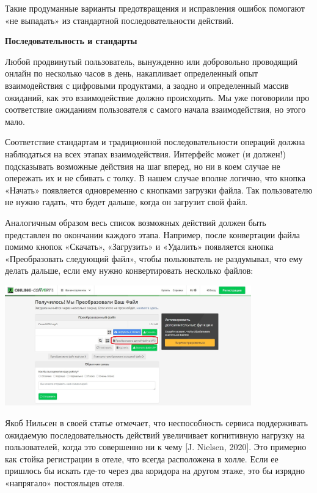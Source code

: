 Такие продуманные варианты предотвращения и исправления ошибок помогают «не выпадать» из стандартной последовательности действий.

\textbf{Последовательность и стандарты}

Любой продвинутый пользователь, вынужденно или добровольно проводящий онлайн по несколько часов в день, накапливает определенный опыт взаимодействия с цифровыми продуктами, а заодно и определенный массив ожиданий, как это взаимодействие должно происходить. Мы уже поговорили про соответствие ожиданиям пользователя с самого начала взаимодействия, но этого мало.

Соответствие стандартам и традиционной последовательности операций должна наблюдаться на всех этапах взаимодействия. Интерфейс может (и должен!) подсказывать возможные действия на шаг вперед, но ни в коем случае не опережать их и не сбивать с толку. В нашем случае вполне логично, что кнопка «Начать» появляется одновременно с кнопками загрузки файла. Так пользователю не нужно гадать, что будет дальше, когда он загрузит свой файл.

Аналогичным образом весь список возможных действий должен быть представлен по окончании каждого этапа. Например, после конвертации файла помимо кнопок «Скачать», «Загрузить» и «Удалить» появляется кнопка «Преобразовать следующий файл», чтобы пользователь не раздумывал, что ему делать дальше, если ему нужно конвертировать несколько файлов:


\begin{center}
    \includegraphics[width=0.8\textwidth]{img/cxp8.jpg}
\end{center}

Якоб Нильсен в своей статье отмечает, что неспособность сервиса поддерживать ожидаемую последовательность действий увеличивает когнитивную нагрузку на пользователей, когда это совершенно ни к чему [J. Nielsen, 2020]. Это примерно как стойка регистрации в отеле, что всегда расположена в холле. Если ее пришлось бы искать где-то через два коридора на другом этаже, это бы изрядно «напрягало» постояльцев отеля.

